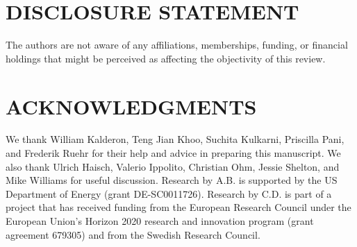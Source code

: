 \documentclass{ar-1col}
\begin{document}
\section*{DISCLOSURE STATEMENT}

The authors are not aware of any affiliations, memberships,
funding, or financial holdings that might be perceived as
affecting the objectivity of this review.

\section*{ACKNOWLEDGMENTS}

We thank William Kalderon, Teng Jian Khoo, Suchita Kulkarni,
Priscilla Pani, and Frederik Ruehr for their help and advice in
preparing this manuscript. We also thank Ulrich Haisch, Valerio
Ippolito, Christian Ohm, Jessie Shelton, and Mike Williams for
useful discussion. Research by A.B. is supported by the US Department of
Energy (grant DE-SC0011726). Research by C.D. is part of a project that
has received funding from the European Research Council
under the European Union's Horizon 2020 research and innovation
program (grant agreement 679305) and from the Swedish
Research Council.
\end{document}
